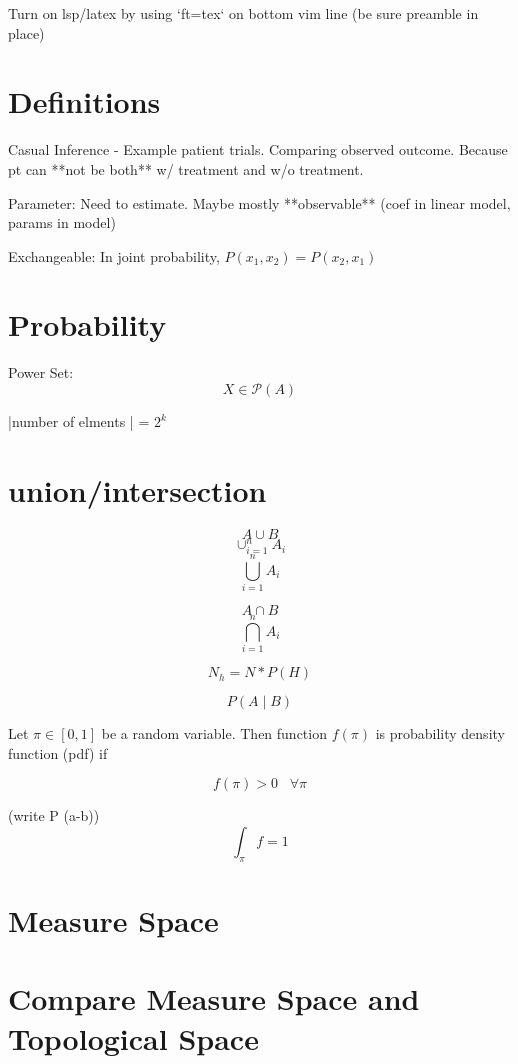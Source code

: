 \documentclass{article}
\begin{document}
Turn on lsp/latex by using `ft=tex` on bottom vim line (be sure preamble in
place)


\section{Definitions}
Casual Inference - Example patient trials.   Comparing observed outcome. Because
pt can **not be both** w/ treatment and w/o treatment.

Parameter:   Need to estimate.   Maybe mostly **observable** (coef in linear
model, params in model)

Exchangeable:  In joint probability,  $P(x_1,x_2) = P(x_2,x_1)$

\section{Probability}

Power Set: \ $$X \in \mathcal{P}(A)$$

|number of elments | = $2^k$

\section{union/intersection}

$$A \cup B$$ 
$$ \cup_{i=1}^{n}A_{i} $$
$$ \bigcup_{i=1}^{n}A_{i} $$

$$A \cap B$$
$$ \bigcap_{i=1}^{n}A_{i} $$

 
$$ N_h = N * P(H) $$

$$	P(A \mid B)$$



Let $\pi \in [0,1]$ be a random variable.
Then function $f(\pi)$ is probability density function (pdf) if

$$f(\pi) >0    \hspace{10pt} \forall \pi$$

(write P (a-b))
$$\int_\pi f = 1 $$



\section{Measure Space}

\section{Compare Measure Space and Topological Space}
\end{document}
